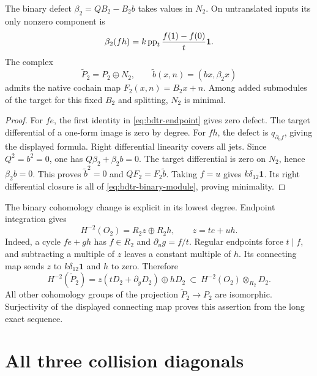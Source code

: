 \begin{proposition}\label{prop:bdtr-binary}
The binary defect $\beta_2=QB_2-B_2b$ takes values in $N_2$.
On untranslated inputs its only nonzero component is
\[
 \beta_2(fh)=k\operatorname{pp}_t\frac{f(1)-f(0)}t\mathbf1.
\]
The complex
\[
 \widetilde P_2=P_2\oplus N_2,
 \qquad \widetilde b(x,n)=(bx,\beta_2x)
\]
admits the native cochain map $F_2(x,n)=B_2x+n$.
Among added submodules of the target for this fixed $B_2$ and splitting, $N_2$ is minimal.
\end{proposition}
\begin{proof}
For $fe$, the first identity in \eqref{eq:bdtr-endpoint} gives zero defect.
The target differential of a one-form image is zero by degree.
For $fh$, the defect is $q_{\partial_uf}$, giving the displayed formula.
Right differential linearity covers all jets.
Since $Q^2=b^2=0$, one has $Q\beta_2+\beta_2b=0$.
The target differential is zero on $N_2$, hence $\beta_2b=0$.
This proves $\widetilde b^2=0$ and $QF_2=F_2\widetilde b$.
Taking $f=u$ gives $k\delta_{12}\mathbf1$.
Its right differential closure is all of \eqref{eq:bdtr-binary-module}, proving minimality.
\end{proof}

The binary cohomology change is explicit in its lowest degree.
Endpoint integration gives
\[
 H^{-2}(O_2)=R_2z\oplus R_2h,\qquad z=te+uh.
\]
Indeed, a cycle $fe+gh$ has $f\in R_2$ and $\partial_ug=f/t$.
Regular endpoints force $t\mid f$, and subtracting a multiple of $z$ leaves a constant multiple of $h$.
Its connecting map sends $z$ to $k\delta_{12}\mathbf1$ and $h$ to zero.
Therefore
\begin{equation}\label{eq:bdtr-binary-cohomology}
 H^{-2}(\widetilde P_2)
 =z(tD_2+\partial_yD_2)\oplus hD_2
 \ \subset\ H^{-2}(O_2)\otimes_{R_2}D_2.
\end{equation}
All other cohomology groups of the projection $\widetilde P_2\to P_2$ are isomorphic.
Surjectivity of the displayed connecting map proves this assertion from the long exact sequence.

\section{All three collision diagonals}

